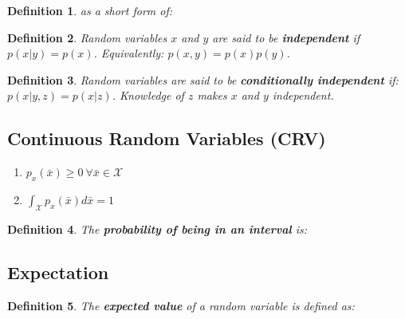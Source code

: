 \documentclass[10pt,a4paper]{scrartcl}
\newtheorem{define}{Definition}
\begin{document}
\begin{multicols*}{2}
\begin{multicols*}{3}
{\begin{define}

as a short form of:

\end{define}

\begin{define}
Random variables $x$ and $y$ are said to be \textbf{independent} if $p(x|y)=p(x)$. Equivalently: $p(x,y)=p(x)p(y)$.
\end{define}

\begin{define}
Random variables are said to be \textbf{conditionally independent} if: $p(x|y,z)=p(x|z)$. Knowledge of $z$ makes $x$ and $y$ independent.
\end{define}

\subsection{Continuous Random Variables (CRV)}


\begin{enumerate}
\item $p_x(\bar{x})\geq 0\ \forall\bar{x}\in\mathcal{X}$
\item $\int_{\mathcal{X}}p_x(\bar{x})d\bar{x}=1$
\end{enumerate}

\begin{define}
The \textbf{probability of being in an interval} is:

\end{define}

\subsection{Expectation}

\begin{define}
The \textbf{expected value} of a random variable is defined as:

\end{define}

}
\end{multicols*}
\end{multicols*}
\end{document}
